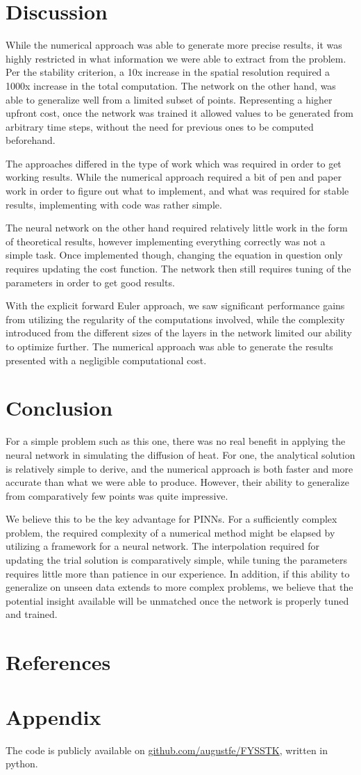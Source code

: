 \documentclass{article}
\theoremstyle{definition}
\begin{document}
\newpage
\section{Discussion}
While the numerical approach was able to generate more precise results, it was highly restricted in what information we were able to extract from the problem. Per the stability criterion, a 10x increase in the spatial resolution required a 1000x increase in the total computation. The network on the other hand, was able to generalize well from a limited subset of points. Representing a higher upfront cost, once the network was trained it allowed values to be generated from arbitrary time steps, without the need for previous ones to be computed beforehand.

The approaches differed in the type of work which was required in order to get working results. While the numerical approach required a bit of pen and paper work in order to figure out what to implement, and what was required for stable results, implementing with code was rather simple.

The neural network on the other hand required relatively little work in the form of theoretical results, however implementing everything correctly was not a simple task. Once implemented though, changing the equation in question only requires updating the cost function. The network then still requires tuning of the parameters in order to get good results.

With the explicit forward Euler approach, we saw significant performance gains from utilizing the regularity of the computations involved, while the complexity introduced from the different sizes of the layers in the network limited our ability to optimize further. The numerical approach was able to generate the results presented with a negligible computational cost.

\section{Conclusion}
For a simple problem such as this one, there was no real benefit in applying the neural network in simulating the diffusion of heat. For one, the analytical solution is relatively simple to derive, and the numerical approach is both faster and more accurate than what we were able to produce. However, their ability to generalize from comparatively few points was quite impressive.

We believe this to be the key advantage for PINNs. For a sufficiently complex problem, the required complexity of a numerical method might be elapsed by utilizing a framework for a neural network. The interpolation required for updating the trial solution is comparatively simple, while tuning the parameters requires little more than patience in our experience. In addition, if this ability to generalize on unseen data extends to more complex problems, we believe that the potential insight available will be unmatched once the network is properly tuned and trained.  

\newpage
\section{References}
\printbibliography

\section{Appendix}
The code is publicly available on \href{https://github.com/augustfe/FYSSTK}{github.com/augustfe/FYSSTK}, written in python.
\end{document}
